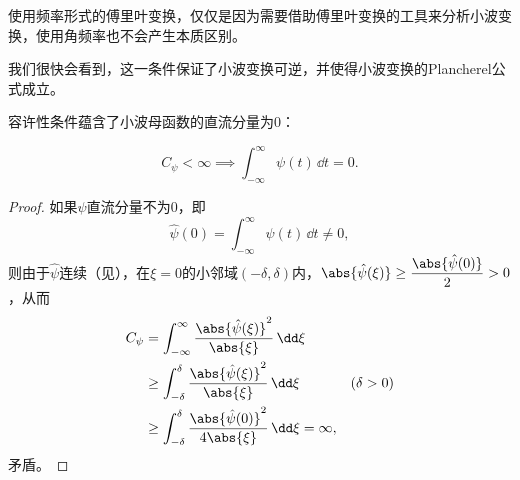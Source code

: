 使用频率形式的傅里叶变换，仅仅是因为需要借助傅里叶变换的工具来分析小波变换，使用角频率也不会产生本质区别。

我们很快会看到，这一条件保证了小波变换可逆，并使得小波变换的Plancherel公式成立。

容许性条件蕴含了小波母函数的直流分量为$0$：

\begin{proposition}
    \begin{equation}
        C_{\psi}<\infty\implies\int_{-\infty}^{\infty}\psi(t)\,\dd t=0.
    \end{equation}
\end{proposition}
\begin{proof}
    如果$\psi$直流分量不为$0$，即
    \begin{equation}
        \hat{\psi}(0)=\int_{-\infty}^{\infty}\psi(t)\,\dd t\neq 0,
    \end{equation}
    则由于$\hat{\psi}$连续（见），在$\xi=0$的小邻域$(-\delta,\delta)$内，$\displaystyle\abs{\hat{\psi}(\xi)}\geq\frac{\abs{\hat{\psi}(0)}}{2}>0$，从而
    \begin{align}
        C_{\psi}&=\int_{-\infty}^{\infty}\frac{\abs{\hat{\psi}(\xi)}^2}{\abs{\xi}}\,\dd\xi\nonumber\\
        &\geq\int_{-\delta}^{\delta}\frac{\abs{\hat{\psi}(\xi)}^2}{\abs{\xi}}\,\dd\xi&(\delta>0)\nonumber\\
        &\geq\int_{-\delta}^{\delta}\frac{\abs{\hat{\psi}(0)}^2}{4\abs{\xi}}\,\dd\xi=\infty,
    \end{align}
    矛盾。
\end{proof}

